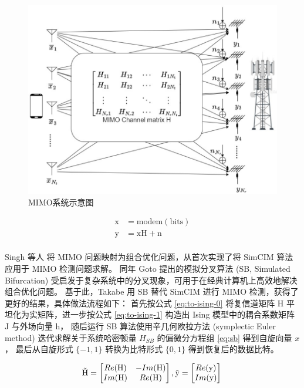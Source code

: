 \documentclass[withoutpreface,bwprint]{cumcmthesis}
\begin{document}
\begin{figure}[h!]
	\centering
	\includegraphics[scale=0.37]{figures/mimo.png}
	\caption{MIMO系统示意图}
	\label{fig:mimo}
\end{figure}

\begin{equation}
\begin{split}
\mathrm{x} &= \mathrm{modem}(\mathrm{bits}) \\
\mathrm{y} &= \mathrm{x} \mathrm{H} + \mathrm{n} \\
\end{split}
\label{eq:mimo}
\end{equation}

Singh 等人 \cite{Singh2021} 将 MIMO 问题映射为组合优化问题，从首次实现了将 SimCIM 算法应用于 MIMO 检测问题求解。
同年 Goto 提出的模拟分叉算法 (SB, Simulated Bifurcation) \cite{Goto2021} 受启发于复杂系统中的分叉现象，可用于在经典计算机上高效地解决组合优化问题。
基于此，Takabe \cite{Takabe2023} 用 SB 替代 SimCIM 进行 MIMO 检测，获得了更好的结果，具体做法流程如下：
首先按公式 \ref{eq:to-ising-0} 将复信道矩阵 $ \mathrm{H} $ 平坦化为实矩阵，进一步按公式 \ref{eq:to-ising-1} 构造出 Ising 模型中的耦合系数矩阵 $ \mathrm{J} $ 与外场向量 $ \mathrm{h} $，
随后运行 SB 算法使用辛几何欧拉方法 (symplectic Euler method) 迭代求解关于系统哈密顿量 $ H_{SB} $ 的偏微分方程组 \ref{eq:sb} 得到自旋向量 $ x $，
最后从自旋形式 $ \{-1,1\} $ 转换为比特形式 $ \{0,1\} $ 得到恢复后的数据比特。

\begin{equation}
\tilde{\mathrm H} = \begin{bmatrix}
   Re(\mathrm H) & -Im(\mathrm H) \\
   Im(\mathrm H) &  Re(\mathrm H) \\ 
\end{bmatrix},
\tilde{\mathrm y} = \begin{bmatrix}
   Re(\mathrm y)  \\
   Im(\mathrm y) \\ 
\end{bmatrix} \\
\label{eq:to-ising-0}
\end{equation}
\end{document}
